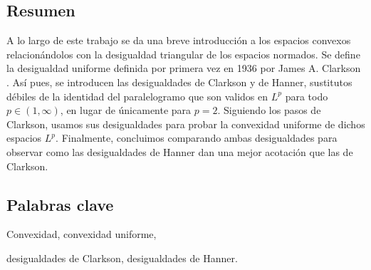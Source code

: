 \documentclass[12pt, twoside]{article}
\begin{document}



\setlength{\parskip}{0.75em}
\renewcommand{\baselinestretch}{1.25}

\subsection*{Resumen}
A lo largo de este trabajo se da una breve introducción a los espacios convexos relacionándolos con la desigualdad triangular de los espacios normados. Se define la desigualdad uniforme definida por primera vez en 1936 por James A. Clarkson \cite{clarkson}. Así pues, se introducen las desigualdades de Clarkson y de Hanner, sustitutos débiles de la identidad del paralelogramo que son validos en $ L^p $ para todo $ p \in (1, \infty) $, en lugar de únicamente para $ p = 2 $. Siguiendo los pasos de Clarkson, usamos sus desigualdades para probar la convexidad uniforme de dichos espacios $ L^p $. Finalmente, concluimos comparando ambas desigualdades para observar como las desigualdades de Hanner dan una mejor acotación que las de Clarkson.

\subsection*{Palabras clave}
Convexidad, convexidad uniforme,

desigualdades de Clarkson, desigualdades de Hanner.

\setcounter{page}{1}
\tableofcontents
\newpage


\newpage

\newpage


\newpage



\end{document}
